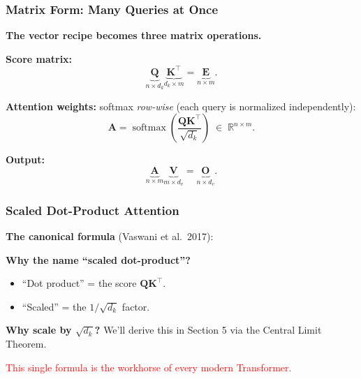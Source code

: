 \documentclass[notes,11pt, aspectratio=169]{beamer}
\DeclareMathOperator{\softmax}{softmax}
\newcommand{\vK}{\mathbf{K}}
\newcommand{\vQ}{\mathbf{Q}}
\newcommand{\vV}{\mathbf{V}}
\newcommand{\vO}{\mathbf{O}}
\newcommand{\R}{\mathbb{R}}
\begin{document}
\begin{frame}
\frametitle{Matrix Form: Many Queries at Once}

\textbf{The vector recipe becomes three matrix operations.}

\vspace{8pt}
\textbf{Score matrix:}
\[
    \underbrace{\vQ}_{n \times d_k}
    \underbrace{\vK^\top}_{d_k \times m}
    =
    \underbrace{\mathbf{E}}_{n \times m}.
\]

\textbf{Attention weights:} softmax \emph{row-wise} (each query is normalized independently):
\[
    \mathbf{A} = \softmax\!\left(\frac{\vQ \vK^\top}{\sqrt{d_k}}\right) \;\in\; \R^{n \times m}.
\]

\textbf{Output:}
\[
    \underbrace{\mathbf{A}}_{n \times m}
    \underbrace{\vV}_{m \times d_v}
    =
    \underbrace{\vO}_{n \times d_v}.
\]
\end{frame}

\begin{frame}
\frametitle{Scaled Dot-Product Attention}

\textbf{The canonical formula} (Vaswani et al.\ 2017):

\vspace{6pt}

\vspace{12pt}
\textbf{Why the name ``scaled dot-product''?}
\begin{itemize}
    \item ``Dot product'' = the score $\vQ \vK^\top$.
    \item ``Scaled'' = the $1/\sqrt{d_k}$ factor.
\end{itemize}

\vspace{6pt}
\textbf{Why scale by $\sqrt{d_k}$?} We'll derive this in Section 5 via the Central Limit Theorem.

\vspace{6pt}
\textcolor{red}{This single formula is the workhorse of every modern Transformer.}
\end{frame}
\end{document}
